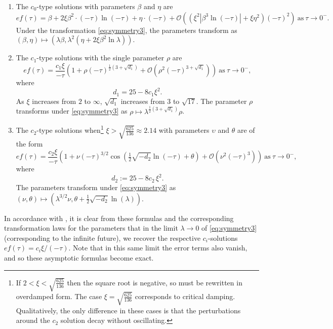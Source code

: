 \begin{enumerate}
\item The $c_{0}$\nobreakdash-type solutions with parameters $\beta$ and $\eta$ are 
\[
ef(\tau)=\beta+2\xi\beta^{2}\cdot(-\tau)\ln(-\tau)+\eta\cdot(-\tau)+\mathcal{O}\left(\left(\xi^{2}\left|\beta^{3}\ln(-\tau)\right|+\xi\eta^{2}\right)(-\tau)^{2}\right)\ \mathrm{as}\ \tau\to0^{-}.
\]
 Under the transformation \eqref{eq:symmetry3}, the parameters transform as $(\beta,\eta)\mapsto(\lambda\beta,\lambda^{2}(\eta+2\xi\beta^{2}\ln\lambda)).$
\item The $c_{1}$\nobreakdash-type solutions with the single parameter $\rho$ are 
\begin{equation}
ef(\tau)=\frac{c_{1}\xi}{-\tau}\left(1+\rho\left(-\tau\right)^{\tfrac{1}{2}\left(3+\sqrt{d_{1}}\right)}+\mathcal{O}\left(\rho^{2}\left(-\tau\right)^{3+\sqrt{d_{1}}}\right)\right)\ \mathrm{as}\ \tau\to0^{-},\label{eq:c1-family}
\end{equation}
 where 
\[
d_{1}=25-8c_{1}\xi^{2}.
\]
 As $\xi$ increases from $2$ to $\infty$, $\sqrt{d_{1}}$ increases from $3$ to $\sqrt{17}$. The parameter $\rho$ transforms under \eqref{eq:symmetry3} as $\rho\mapsto\lambda^{\tfrac{1}{2}\left(3+\sqrt{d_{1}}\right)}\rho$. 
\item The $c_{2}$\nobreakdash-type solutions when\footnote{If $2<\xi<\sqrt{\frac{625}{136}}$ then the square root is negative, so  must be rewritten in overdamped form. The case $\xi=\sqrt{\frac{625}{136}}$ corresponds to critical damping. Qualitatively, the only difference in these cases is that the perturbations around the $c_{2}$ solution decay without oscillating. } $\xi>\sqrt{\frac{625}{136}}\approx2.14$ with parameters $\upsilon$ and $\theta$ are of the form 
\begin{equation}
ef(\tau)=\frac{c_{2}\xi}{-\tau}\left(1+\nu(-\tau)^{3/2}\cos\left(\tfrac{1}{2}\sqrt{-d_{2}}\ln(-\tau)+\theta\right)+\mathcal{O}\left(\nu^{2}(-\tau)^{3}\right)\right)\ \mathrm{as}\ \tau\to0^{-},\label{eq:c2-sol}
\end{equation}
 where 
\[
d_{2}:=25-8c_{2}\,\xi^{2}.
\]
 The parameters transform under \eqref{eq:symmetry3} as $(\nu,\theta)\mapsto(\lambda^{3/2}\nu,\theta+\tfrac{1}{2}\sqrt{-d_{2}}\ln(\lambda))$. 
\end{enumerate}
In accordance with , it is clear from these formulas and the corresponding transformation laws for the parameters that in the limit $\lambda\to0$ of \eqref{eq:symmetry3} (corresponding to the infinite future), we recover the respective $c_{i}$-solutions $ef(\tau)=c_{i}\xi/(-\tau)$. Note that in this same limit the error terms also vanish, and so these asymptotic formulas become exact.

